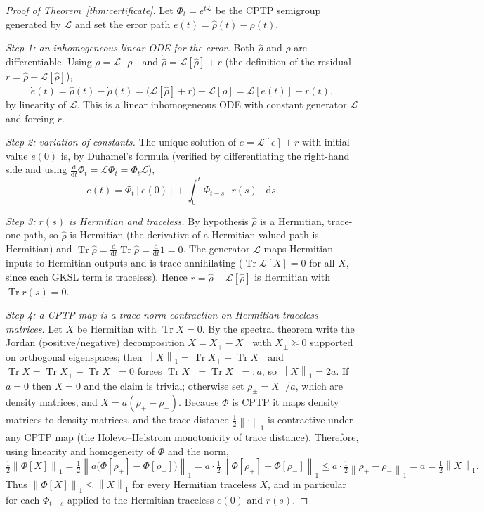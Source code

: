 \documentclass[11pt]{article}
\DeclareMathOperator{\Tr}{Tr}
\newcommand{\calL}{\mathcal{L}}
\newcommand{\dd}{\mathrm{d}}
\newcommand{\norm}[1]{\left\lVert #1 \right\rVert}
\newcommand{\rhohat}{\widehat{\rho}}
\begin{document}
\begin{proof}[Proof of Theorem~\ref{thm:certificate}]
Let $\Phi_t=e^{t\calL}$ be the CPTP semigroup generated by $\calL$ and set the error path $e(t)=\rhohat(t)-\rho(t)$.

\emph{Step 1: an inhomogeneous linear ODE for the error.} Both $\rhohat$ and $\rho$ are differentiable. Using $\dot\rho=\calL[\rho]$ and $\dot\rhohat=\calL[\rhohat]+r$ (the definition of the residual $r=\dot\rhohat-\calL[\rhohat]$),
\[
\dot e(t)=\dot\rhohat(t)-\dot\rho(t)=\big(\calL[\rhohat]+r\big)-\calL[\rho]=\calL[e(t)]+r(t),
\]
by linearity of $\calL$. This is a linear inhomogeneous ODE with constant generator $\calL$ and forcing $r$.

\emph{Step 2: variation of constants.} The unique solution of $\dot e=\calL[e]+r$ with initial value $e(0)$ is, by Duhamel's formula (verified by differentiating the right-hand side and using $\tfrac{\dd}{\dd t}\Phi_t=\calL\Phi_t=\Phi_t\calL$),
\[
e(t)=\Phi_t[e(0)]+\int_0^t\Phi_{t-s}[r(s)]\,\dd s.
\]

\emph{Step 3: $r(s)$ is Hermitian and traceless.} By hypothesis $\rhohat$ is a Hermitian, trace-one path, so $\dot\rhohat$ is Hermitian (the derivative of a Hermitian-valued path is Hermitian) and $\Tr\dot\rhohat=\tfrac{\dd}{\dd t}\Tr\rhohat=\tfrac{\dd}{\dd t}1=0$. The generator $\calL$ maps Hermitian inputs to Hermitian outputs and is trace annihilating ($\Tr\calL[X]=0$ for all $X$, since each GKSL term is traceless). Hence $r=\dot\rhohat-\calL[\rhohat]$ is Hermitian with $\Tr r(s)=0$.

\emph{Step 4: a CPTP map is a trace-norm contraction on Hermitian traceless matrices.} Let $X$ be Hermitian with $\Tr X=0$. By the spectral theorem write the Jordan (positive/negative) decomposition $X=X_+-X_-$ with $X_\pm\succeq0$ supported on orthogonal eigenspaces; then $\norm{X}_1=\Tr X_++\Tr X_-$ and $\Tr X=\Tr X_+-\Tr X_-=0$ forces $\Tr X_+=\Tr X_-=:a$, so $\norm{X}_1=2a$. If $a=0$ then $X=0$ and the claim is trivial; otherwise set $\rho_\pm=X_\pm/a$, which are density matrices, and $X=a(\rho_+-\rho_-)$. Because $\Phi$ is CPTP it maps density matrices to density matrices, and the trace distance $\tfrac12\norm{\cdot}_1$ is contractive under any CPTP map (the Holevo--Helstrom monotonicity of trace distance). Therefore, using linearity and homogeneity of $\Phi$ and the norm,
\[
\tfrac12\norm{\Phi[X]}_1=\tfrac12\norm{a\big(\Phi[\rho_+]-\Phi[\rho_-]\big)}_1=a\cdot\tfrac12\norm{\Phi[\rho_+]-\Phi[\rho_-]}_1\le a\cdot\tfrac12\norm{\rho_+-\rho_-}_1=a=\tfrac12\norm{X}_1.
\]
Thus $\norm{\Phi[X]}_1\le\norm{X}_1$ for every Hermitian traceless $X$, and in particular for each $\Phi_{t-s}$ applied to the Hermitian traceless $e(0)$ and $r(s)$.


\end{proof}
\end{document}
